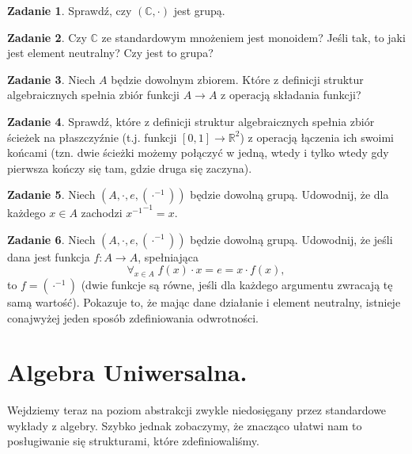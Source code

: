 \documentclass{article}
\theoremstyle{definition}
\newtheorem{exercise}{Zadanie}[section]
\begin{document}
\begin{exercise}
	Sprawdź, czy $(\mathbb{C}, \cdot)$ jest grupą.
\end{exercise}

\begin{exercise}
	Czy $\mathbb{C}$ ze standardowym mnożeniem jest monoidem? Jeśli tak, to jaki jest element neutralny? Czy jest to grupa?
\end{exercise}

\begin{exercise}
	Niech $A$ będzie dowolnym zbiorem.
	Które z definicji struktur algebraicznych spełnia zbiór funkcji $A \to A$ z operacją składania funkcji?
\end{exercise}

\begin{exercise}
	Sprawdź, które z definicji struktur algebraicznych spełnia zbiór ścieżek na płaszczyźnie (t.j. funkcji $[0, 1] \to \mathbb{R}^2$) z operacją łączenia ich swoimi końcami (tzn. dwie ścieżki możemy połączyć w jedną, wtedy i tylko wtedy gdy pierwsza kończy się tam, gdzie druga się zaczyna).
\end{exercise}

\begin{exercise}
    Niech $(A, \cdot, e, (\cdot^{-1}))$ będzie dowolną grupą.
    Udowodnij, że dla każdego $x \in A$ zachodzi ${x^{-1}}^{-1} = x$.
\end{exercise}


\begin{exercise}
    Niech $(A, \cdot, e, (\cdot^{-1}))$ będzie dowolną grupą.
    Udowodnij, że jeśli dana jest funkcja $f: A \to A$, spełniająca
    \begin{equation*}
        \forall_{x\in A}\; f(x) \cdot x = e = x \cdot f(x),
    \end{equation*}
    to $f = (\cdot^{-1})$ (dwie funkcje są równe, jeśli dla każdego argumentu zwracają tę samą wartość).
    Pokazuje to, że mając dane działanie i element neutralny,
        istnieje conajwyżej jeden sposób zdefiniowania odwrotności.
\end{exercise}

\section{Algebra Uniwersalna.}
Wejdziemy teraz na poziom abstrakcji zwykle niedosięgany przez standardowe wykłady z algebry.
Szybko jednak zobaczymy,
że znacząco ułatwi nam to posługiwanie się strukturami,
które zdefiniowaliśmy.
\end{document}
